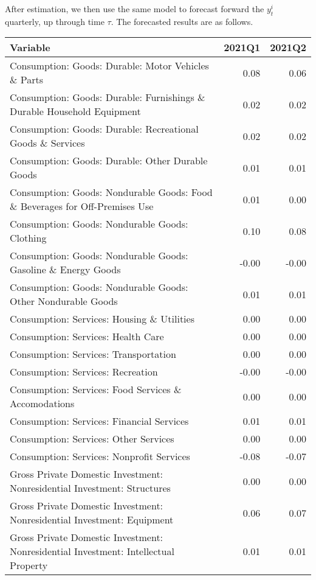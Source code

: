 \documentclass[11pt, letterpaper]{article}\usepackage[]{graphicx}\usepackage[]{color}
\begin{document}
After estimation, we then use the same model to forecast forward the $y^i_t$ quarterly, up through time $\tau$. 
The forecasted results are as follows.
\begin{table}[H]
\centering
\begingroup\scriptsize
\begin{tabular}{lrr}
  \hline
Variable & 2021Q1 & 2021Q2 \\ 
  \hline
Consumption: Goods: Durable: Motor Vehicles \& Parts & 0.08 & 0.06 \\ 
  Consumption: Goods: Durable: Furnishings \& Durable Household Equipment & 0.02 & 0.02 \\ 
  Consumption: Goods: Durable: Recreational Goods \& Services & 0.02 & 0.02 \\ 
  Consumption: Goods: Durable: Other Durable Goods & 0.01 & 0.01 \\ 
  Consumption: Goods: Nondurable Goods: Food \& Beverages for Off-Premises Use & 0.01 & 0.00 \\ 
  Consumption: Goods: Nondurable Goods: Clothing & 0.10 & 0.08 \\ 
  Consumption: Goods: Nondurable Goods: Gasoline \& Energy Goods & -0.00 & -0.00 \\ 
  Consumption: Goods: Nondurable Goods: Other Nondurable Goods & 0.01 & 0.01 \\ 
  Consumption: Services: Housing \& Utilities & 0.00 & 0.00 \\ 
  Consumption: Services: Health Care & 0.00 & 0.00 \\ 
  Consumption: Services: Transportation & 0.00 & 0.00 \\ 
  Consumption: Services: Recreation & -0.00 & -0.00 \\ 
  Consumption: Services: Food Services \& Accomodations & 0.00 & 0.00 \\ 
  Consumption: Services: Financial Services & 0.01 & 0.01 \\ 
  Consumption: Services: Other Services & 0.00 & 0.00 \\ 
  Consumption: Services: Nonprofit Services & -0.08 & -0.07 \\ 
  Gross Private Domestic Investment: Nonresidential Investment: Structures & 0.00 & 0.00 \\ 
  Gross Private Domestic Investment: Nonresidential Investment: Equipment & 0.06 & 0.07 \\ 
  Gross Private Domestic Investment: Nonresidential Investment: Intellectual Property & 0.01 & 0.01 \\ 

\end{tabular}
\end{table}
\end{document}
